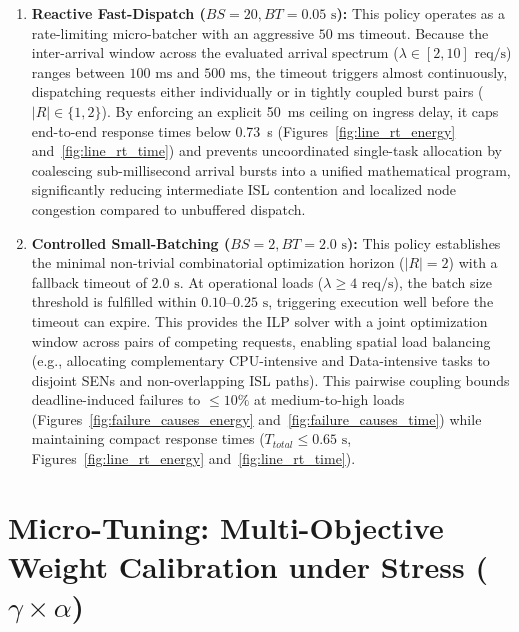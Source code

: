 \begin{enumerate}
    \item \textbf{Reactive Fast-Dispatch ($BS=20, BT=0.05\text{ s}$):} 
    This policy operates as a rate-limiting micro-batcher with an aggressive $50\text{ ms}$ timeout. Because the inter-arrival window across the evaluated arrival spectrum ($\lambda \in [2, 10]\text{ req/s}$) ranges between $100\text{ ms}$ and $500\text{ ms}$, the timeout triggers almost continuously, dispatching requests either individually or in tightly coupled burst pairs ($|R| \in \{1, 2\}$). By enforcing an explicit 50~ms ceiling on ingress delay, it caps end-to-end response times below 0.73~s (Figures~\ref{fig:line_rt_energy} and~\ref{fig:line_rt_time}) and prevents uncoordinated single-task allocation by coalescing sub-millisecond arrival bursts into a unified mathematical program, significantly reducing intermediate ISL contention and localized node congestion compared to unbuffered dispatch.

    \item \textbf{Controlled Small-Batching ($BS=2, BT=2.0\text{ s}$):} 
    This policy establishes the minimal non-trivial combinatorial optimization horizon ($|R|=2$) with a fallback timeout of $2.0\text{ s}$. At operational loads ($\lambda \ge 4\text{ req/s}$), the batch size threshold is fulfilled within $0.10\text{--}0.25\text{ s}$, triggering execution well before the timeout can expire. This provides the ILP solver with a joint optimization window across pairs of competing requests, enabling spatial load balancing~\cite{tang2003loadbalancing}
    (e.g., allocating complementary CPU-intensive and Data-intensive tasks to disjoint SENs and non-overlapping ISL paths). This pairwise coupling bounds deadline-induced failures to $\le 10\%$ at medium-to-high loads (Figures~\ref{fig:failure_causes_energy} and~\ref{fig:failure_causes_time})
    while maintaining compact response times ($T_{total} \le 0.65\text{ s}$, Figures~\ref{fig:line_rt_energy} and~\ref{fig:line_rt_time}).
\end{enumerate}

\section{\texorpdfstring{Micro-Tuning: Multi-Objective Weight Calibration under Stress ($\gamma \times \alpha$)}{Micro-Tuning: Multi-Objective Weight Calibration under Stress (gamma x alpha)}}
\label{sec:cross_sensitivity}

